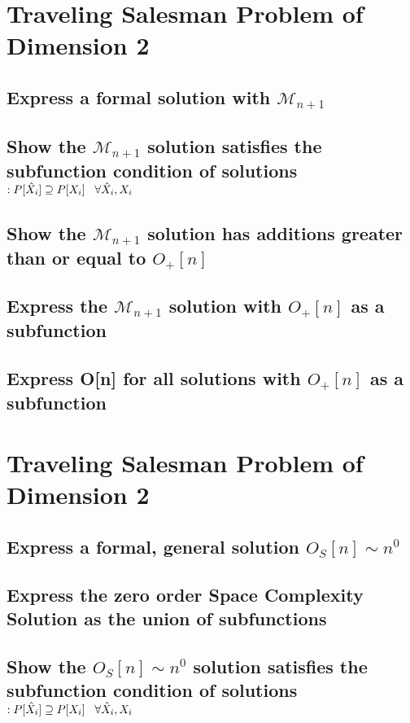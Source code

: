 \documentclass[11pt]{article}
\begin{document}
\section*{Traveling Salesman Problem of Dimension 2}
\subsection{Express a formal solution with $\mathcal{M}_{n+1}$}
\subsection{Show the $\mathcal{M}_{n+1}$ solution satisfies the  subfunction condition of solutions$: P[\hat{X}_i] \supseteq P[X_i] \hspace{3mm} \forall \hat{X}_i,X_i$}
\subsection{Show the $\mathcal{M}_{n+1}$ solution has additions greater than or equal to $O_{+}[n]$}
\subsection{Express the $\mathcal{M}_{n+1}$ solution with $O_{+}[n]$ as a subfunction}
\subsection{Express O[n] for all solutions with $O_{+}[n]$ as a subfunction}


\newpage
\section*{Traveling Salesman Problem of Dimension 2}
\subsection{Express a formal, general solution $O_S[n] \sim n^0$}
\subsection{Express the zero order Space Complexity Solution as the union of subfunctions}
\subsection{Show the $O_S[n] \sim n^0$ solution satisfies the  subfunction condition of solutions$: P[\hat{X}_i] \supseteq P[X_i] \hspace{3mm} \forall \hat{X}_i,X_i$}
\end{document}
